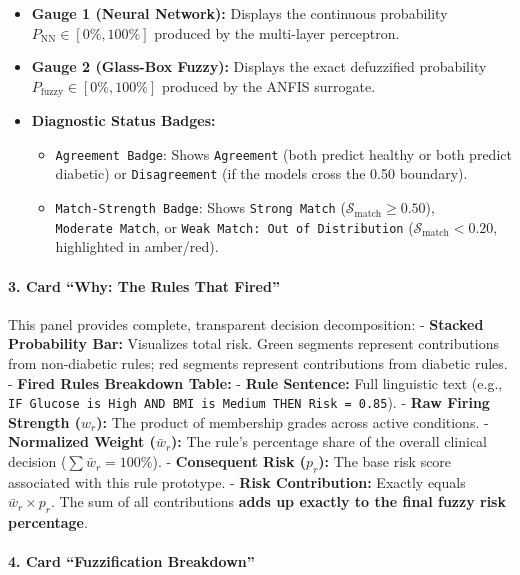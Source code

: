 \begin{itemize}
\tightlist
\item
  \textbf{Gauge 1 (Neural Network):} Displays the continuous probability
  \(P_{\text{NN}} \in [0\%, 100\%]\) produced by the multi-layer
  perceptron.
\item
  \textbf{Gauge 2 (Glass-Box Fuzzy):} Displays the exact defuzzified
  probability \(P_{\text{fuzzy}} \in [0\%, 100\%]\) produced by the
  ANFIS surrogate.
\item
  \textbf{Diagnostic Status Badges:}

  \begin{itemize}
  \tightlist
  \item
    \texttt{Agreement\ Badge}: Shows \texttt{Agreement} (both predict
    healthy or both predict diabetic) or \texttt{Disagreement} (if the
    models cross the 0.50 boundary).
  \item
    \texttt{Match-Strength\ Badge}: Shows \texttt{Strong\ Match}
    (\(\mathcal{S}_{\text{match}} \ge 0.50\)), \texttt{Moderate\ Match},
    or \texttt{Weak\ Match:\ Out\ of\ Distribution}
    (\(\mathcal{S}_{\text{match}} < 0.20\), highlighted in amber/red).
  \end{itemize}
\end{itemize}

\paragraph{3. Card ``Why: The Rules That
Fired''}\label{card-why-the-rules-that-fired}

This panel provides complete, transparent decision decomposition: -
\textbf{Stacked Probability Bar:} Visualizes total risk. Green segments
represent contributions from non-diabetic rules; red segments represent
contributions from diabetic rules. - \textbf{Fired Rules Breakdown
Table:} - \textbf{Rule Sentence:} Full linguistic text (e.g.,
\texttt{IF\ Glucose\ is\ High\ AND\ BMI\ is\ Medium\ THEN\ Risk\ =\ 0.85}).
- \textbf{Raw Firing Strength (\(w_r\)):} The product of membership
grades across active conditions. - \textbf{Normalized Weight
(\(\bar{w}_r\)):} The rule's percentage share of the overall clinical
decision (\(\sum \bar{w}_r = 100\%\)). - \textbf{Consequent Risk
(\(p_r\)):} The base risk score associated with this rule prototype. -
\textbf{Risk Contribution:} Exactly equals \(\bar{w}_r \times p_r\). The
sum of all contributions \textbf{adds up exactly to the final fuzzy risk
percentage}.

\paragraph{4. Card ``Fuzzification
Breakdown''}\label{card-fuzzification-breakdown}

